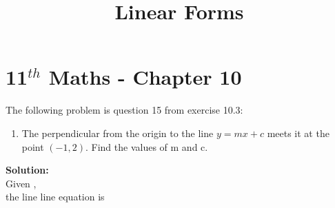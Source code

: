 \documentclass[12pt]{article}
\newcommand{\solution}{\noindent \textbf{Solution: }}
\begin{document}
\graphicspath{{./Documents}{./figs}}
\begin{center}
  \title{\textbf{Linear Forms}}
  \date{\vspace{-5ex}}
  \maketitle
\end{center}
\setcounter{page}{1}
\section*{11$ ^{th} $ Maths - Chapter 10}
The following problem is question 15 from exercise 10.3:
\begin{enumerate}
\item The perpendicular from the origin to the line $y=mx+c$ meets it at the point $(-1,2)$. Find the values of m and c.
\end{enumerate}
\solution \\
Given ,\\
the line line equation is
\end{document}
